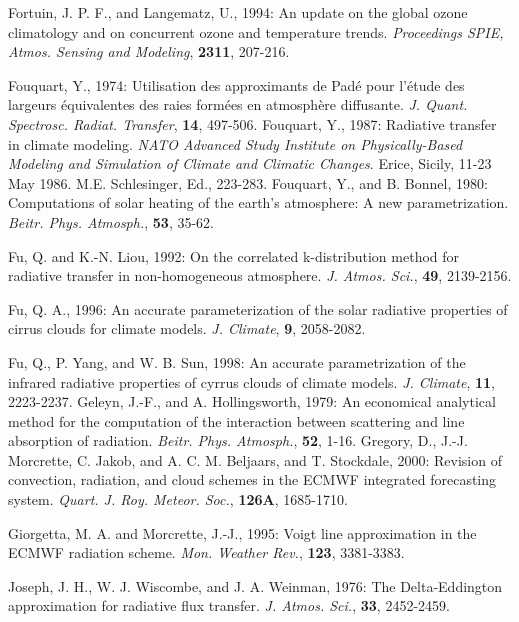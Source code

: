 \decrefname
Fortuin, J. P. F., and Langematz, U., 1994: An update on the global ozone climatology and on concurrent ozone and temperature trends.
{\it Proceedings SPIE, Atmos. Sensing and Modeling},
{\bf 2311}, 207-216.

\decrefname
Fouquart, Y., 1974:
      Utilisation des approximants de Pad\'e pour l'\'etude des largeurs
      \'equivalentes des raies form\'ees en atmosph\`ere diffusante.
      {\it J. Quant. Spectrosc. Radiat. Transfer},
      {\bf 14},
      497-506.
\decrefname
Fouquart, Y., 1987:
      Radiative transfer in climate modeling.
      {\it NATO Advanced Study Institute on Physically-Based Modeling and
      Simulation of Climate and Climatic Changes}.
      Erice, Sicily, 11-23 May 1986. M.E. Schlesinger, Ed.,
      223-283.
\decrefname
Fouquart, Y., and B. Bonnel, 1980:
      Computations of solar heating of the earth's atmosphere: A new
      parametrization.
      {\it Beitr. Phys. Atmosph.},
      {\bf 53},
      35-62.

\decrefname
Fu, Q. and K.-N. Liou, 1992: On the correlated k-distribution method for radiative transfer in non-homogeneous atmosphere.
{\it  J. Atmos. Sci.}, {\bf 49}, 2139-2156.

\decrefname
Fu, Q. A., 1996: An accurate parameterization of the solar radiative properties of cirrus clouds for climate models.
{\it  J. Climate}, {\bf 9}, 2058-2082.

\decrefname
Fu, Q., P. Yang, and W. B. Sun, 1998: An accurate parametrization of the infrared radiative properties of cyrrus clouds of climate models.
{\it  J. Climate}, {\bf 11}, 2223-2237.
\decrefname
Geleyn, J.-F., and A. Hollingsworth, 1979:
      An economical analytical method for the computation of the interaction
      between scattering and line absorption of radiation.
      {\it Beitr. Phys. Atmosph.},
      {\bf 52},
      1-16.
\decrefname
Gregory, D., J.-J. Morcrette, C. Jakob, and A. C. M. Beljaars, and T. Stockdale,
2000: Revision of convection, radiation, and cloud schemes in the ECMWF
integrated forecasting system.
{\it  Quart. J. Roy. Meteor. Soc.},
{\bf 126A}, 1685-1710.

\decrefname
Giorgetta, M. A. and Morcrette, J.-J., 1995:
Voigt line approximation in the ECMWF radiation scheme. 
{\it Mon. Weather Rev.},
{\bf 123}, 3381-3383.

\decrefname
Joseph, J. H., W. J. Wiscombe, and J. A. Weinman, 1976:
      The Delta-Eddington approximation for radiative flux transfer.
      {\it J. Atmos. Sci.},
      {\bf 33},
      2452-2459.

